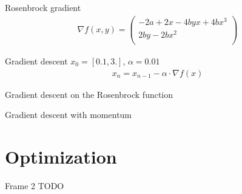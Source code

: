 \documentclass{beamer}
\begin{document}
    \begin{frame}{Rosenbrock gradient}
      \begin{align}
        \nabla f(x, y) = \begin{pmatrix}
          -2a + 2x - 4byx + 4bx^3 \\
          2by - 2bx^2 \\
        \end{pmatrix}
      \end{align}
    \end{frame}

    \begin{frame}{Gradient descent}
      $x_0 = [0.1, 3.]$,
      $\alpha = 0.01 $
      \begin{align}
        x_n = x_{n-1} - \alpha \cdot \nabla f(x)
      \end{align}
    \end{frame}

    \begin{frame}{Gradient descent on the Rosenbrock function}
      \centering
    \end{frame}

    \begin{frame}{Gradient descent with momentum}
      \centering
    \end{frame}


    \section{Optimization}
    \begin{frame}{Frame 2}
        TODO
    \end{frame}
\end{document}
